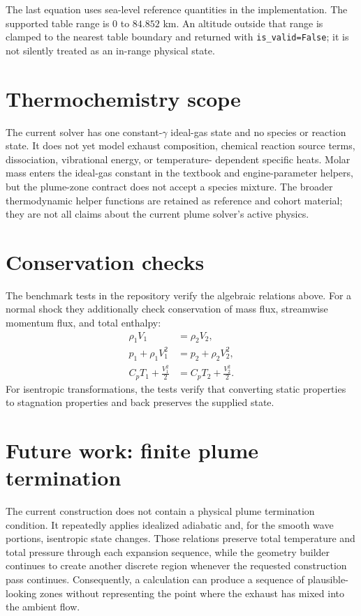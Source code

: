 \documentclass[11pt]{article}
\begin{document}
The last equation uses sea-level reference quantities in the implementation.
The supported table range is \(0\) to \(84.852\) km.  An altitude outside that
range is clamped to the nearest table boundary and returned with
\texttt{is\_valid=False}; it is not silently treated as an in-range physical
state.

\section{Thermochemistry scope}

The current solver has one constant-\(\gamma\) ideal-gas state and no species
or reaction state.  It does not yet model exhaust composition, chemical
reaction source terms, dissociation, vibrational energy, or temperature-
dependent specific heats.  Molar mass enters the ideal-gas constant in the
textbook and engine-parameter helpers, but the plume-zone contract does not
accept a species mixture.  The broader thermodynamic helper functions are
retained as reference and cohort material; they are not all claims about the
current plume solver's active physics.

\section{Conservation checks}

The benchmark tests in the repository verify the algebraic relations above.
For a normal shock they additionally check conservation of mass flux,
streamwise momentum flux, and total enthalpy:
\begin{align}
  \rho_1 V_1 &= \rho_2 V_2, \\
  p_1+\rho_1 V_1^2 &= p_2+\rho_2 V_2^2, \\
  C_pT_1+\frac{V_1^2}{2} &= C_pT_2+\frac{V_2^2}{2}.
\end{align}
For isentropic transformations, the tests verify that converting static
properties to stagnation properties and back preserves the supplied state.

\section{Future work: finite plume termination}

The current construction does not contain a physical plume termination
condition.  It repeatedly applies idealized adiabatic and, for the smooth
wave portions, isentropic state changes.  Those relations preserve total
temperature and total pressure through each expansion sequence, while the
geometry builder continues to create another discrete region whenever the
requested construction pass continues.  Consequently, a calculation can
produce a sequence of plausible-looking zones without representing the point
where the exhaust has mixed into the ambient flow.
\end{document}

